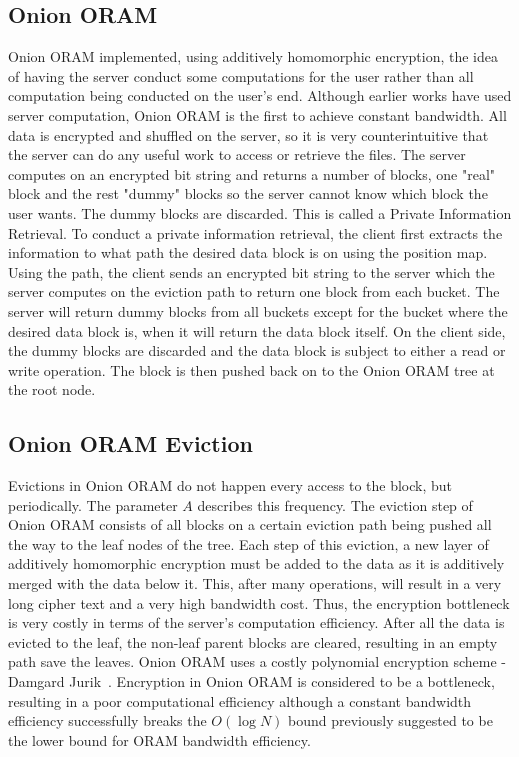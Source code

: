 \documentclass[12pt, oneside]{article}   	%
\begin{document}
\subsection{Onion ORAM}
Onion ORAM implemented, using additively homomorphic encryption, the idea of having the server conduct some computations for the user rather than all computation being conducted on the user's end. Although earlier works have used server computation, Onion ORAM is the first to achieve constant bandwidth. All data is encrypted and shuffled on the server, so it is very counterintuitive that the server can do any useful work to access or retrieve the files. The server computes on an encrypted bit string and returns a number of blocks, one "real" block and the rest "dummy" blocks so the server cannot know which block the user wants. The dummy blocks are discarded. This is called a Private Information Retrieval. To conduct a private information retrieval, the client first extracts the information to what path the desired data block is on using the position map. Using the path, the client sends an encrypted bit string to the server which the server computes on the eviction path to return one block from each bucket. The server will return dummy blocks from all buckets except for the bucket where the desired data block is, when it will return the data block itself. On the client side, the dummy blocks are discarded and the data block is subject to either a read or write operation. The block is then pushed back on to the Onion ORAM tree at the root node. 

\subsection{Onion ORAM Eviction}
Evictions in Onion ORAM do not happen every access to the block, but periodically. The parameter $A$ describes this frequency. The eviction step of Onion ORAM consists of all blocks on a certain eviction path being pushed all the way to the leaf nodes of the tree. Each step of this eviction, a new layer of additively homomorphic encryption must be added to the data as it is additively merged with the data below it. This, after many operations, will result in a very long cipher text and a very high bandwidth cost. Thus, the encryption bottleneck is very costly in terms of the server's computation efficiency. After all the data is evicted to the leaf, the non-leaf parent blocks are cleared, resulting in an empty path save the leaves. Onion ORAM uses a costly polynomial encryption scheme - Damgard Jurik~\cite{damgard}. Encryption in Onion ORAM is considered to be a bottleneck, resulting in a poor computational efficiency although a constant bandwidth efficiency successfully breaks the $O (\log N)$ bound previously suggested to be the lower bound for ORAM bandwidth efficiency.
\end{document}

